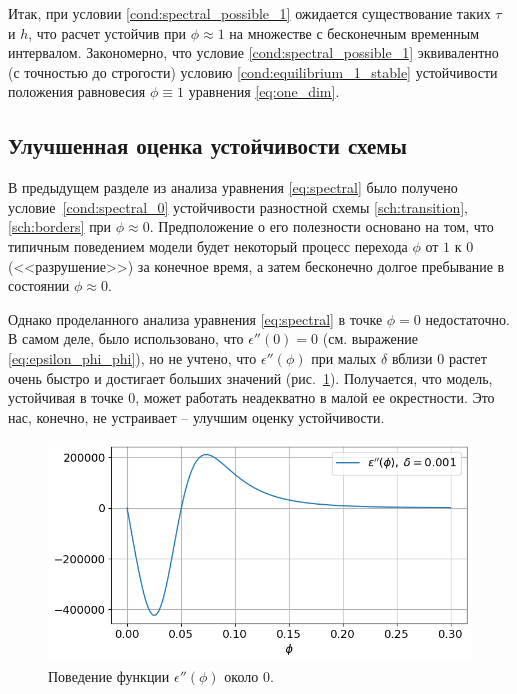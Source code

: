 Итак, при условии \eqref{cond:spectral_possible_1} ожидается существование таких $\tau$ и $h$, что расчет устойчив при $\phi \approx 1$ на множестве с бесконечным временным интервалом. Закономерно, что условие \eqref{cond:spectral_possible_1} эквивалентно (с точностью до строгости) условию \eqref{cond:equilibrium_1_stable} устойчивости положения равновесия $\phi \equiv 1$ уравнения \eqref{eq:one_dim}.


\subsection{Улучшенная оценка устойчивости схемы}

В предыдущем разделе из анализа уравнения \eqref{eq:spectral} было получено условие~\eqref{cond:spectral_0} устойчивости разностной схемы \eqref{sch:transition}, \eqref{sch:borders} при $\phi \approx 0$. Предположение о его полезности основано на том, что типичным поведением модели будет некоторый процесс перехода $\phi$ от $1$ к $0$ (<<разрушение>>) за конечное время, а затем бесконечно долгое пребывание в состоянии $\phi \approx 0$.

Однако проделанного анализа уравнения \eqref{eq:spectral} в точке $\phi = 0$ недостаточно. В самом деле, было использовано, что $\epsilon''(0) = 0$ (см. выражение \eqref{eq:epsilon_phi_phi}), но не учтено, что $\epsilon''(\phi)$ при малых $\delta$ вблизи $0$ растет очень быстро и достигает больших значений (рис.~\ref{fig:eps_phi_phi}). Получается, что модель, устойчивая в точке $0$, может работать неадекватно в малой ее окрестности. Это нас, конечно, не устраивает -- улучшим оценку устойчивости.

\begin{figure}[!tp]
    \centering
    \includegraphics[width=\textwidth]{figures/eps_phi_phi.png}
    \vspace{-0.7cm}
    \caption{Поведение функции $\epsilon''(\phi)$ около $0$.}
    \label{fig:eps_phi_phi}
\end{figure}

